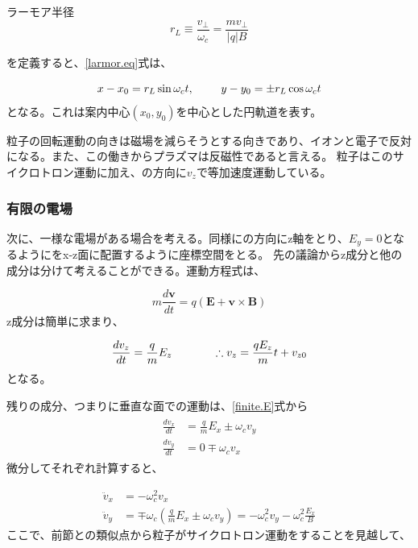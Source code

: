 \documentclass{ltjsarticle}
\numberwithin{equation}{section} %
\begin{document}
\begin{eqbox}{ラーモア半径}
\begin{equation}
  r_L \equiv \frac{v_\perp}{\omega_c} = \frac{mv_\perp}{|q|B} \label{larmor.radi}
\end{equation}
\end{eqbox}  
を定義すると、\eqref{larmor.eq}式は、

\begin{equation}
  x - x_0 = r_L \sin \omega_c t, \hspace{2pc} y -y_0 = \pm r_L \cos \omega_c t \label{guiding_center_eq}
\end{equation}
となる。これは案内中心$(x_0, y_0)$を中心とした円軌道を表す。

粒子の回転運動の向きは磁場を減らそうとする向きであり、イオンと電子で反対になる。また、この働きからプラズマは反磁性であると言える。
粒子はこのサイクロトロン運動に加え、の方向に$v_z$で等加速度運動している。

\subsubsection{有限の電場}
次に、一様な電場がある場合を考える。同様にの方向にz軸をとり、$E_y=0$となるようにをx-z面に配置するように座標空間をとる。
先の議論からz成分と他の成分は分けて考えることができる。運動方程式は、

\begin{equation}
  m\frac{d\bm{v}}{dt} = q(\bm{E} + \bm{v}\times \bm{B}) \label{finite.E}
\end{equation}
z成分は簡単に求まり、

\begin{equation}
  \frac{dv_z}{dt} = \frac{q}{m}E_z \hspace{3pc} \therefore v_z = \frac{qE_z}{m}t + v_{z0}
\end{equation}
となる。

残りの成分、つまりに垂直な面での運動は、\eqref{finite.E}式から
\begin{align}
  \begin{split}
    \frac{dv_x}{dt} &= \frac{q}{m}E_x \pm \omega_c v_y\\
    \frac{dv_y}{dt} &= 0 \mp \omega_c v_x
  \end{split}
\end{align}
微分してそれぞれ計算すると、

\begin{subequations}
  \begin{align}
    \ddot{v}_x &= -\omega_c^2v_x\\
    \ddot{v}_y &= \mp \omega_c\left(\frac{q}{m}E_x \pm \omega_c v_y\right) = -\omega^2_c v_y -\omega^2_c\frac{E_x}{B} \label{v_e.eq}
  \end{align} \label{base_eq}
\end{subequations} 
  ここで、前節との類似点から粒子がサイクロトロン運動をすることを見越して、
\end{document}
